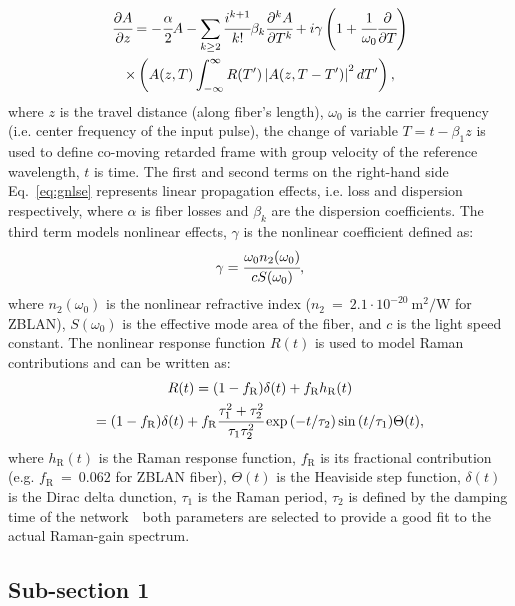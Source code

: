 \documentclass[../main.tex]{subfiles}
\begin{document}
\begin{equation}
\begin{gathered}
\cfrac{\partial A}{\partial z}=-\cfrac{\alpha}{2}A - \sum\limits_{k\geq2}\cfrac{i^{k+1}}{k!} \beta_k \cfrac{\partial^k A}{\partial T^k}+i\gamma \left(1+\cfrac{1}{\omega_0}\cfrac{\partial}{\partial T} \right)\\
\times \left(A(z,T) \int_{-\infty}^{\infty} R(T') \left|A(z,T-T')\right|^2 dT'\right),
\end{gathered}
\label{eq:gnlse}
\end{equation}
where $z$ is the travel distance (along fiber's length), $\omega_0$ is the carrier frequency (i.e. center frequency of the input pulse), the change of variable $T=t-\beta_1 z$ is used to define co-moving retarded frame with group velocity of the reference wavelength, $t$ is time.
The first and second terms on the right-hand side Eq.~\eqref{eq:gnlse} represents linear propagation effects, i.e. loss and dispersion respectively, where $\alpha$ is fiber losses and $\beta_k$ are the dispersion coefficients. The third term models nonlinear effects, $\gamma$ is the nonlinear coefficient defined as:
\begin{equation}
\gamma=\cfrac{\omega_0 n_2(\omega_0)}{c S(\omega_0)},
\label{eq:noncoef}
\end{equation}
where $n_2(\omega_0)$ is the nonlinear refractive index ($n_2~=~2.1 \cdot  10^{-20}~\mathrm{m^2/W}$ for ZBLAN), $S(\omega_0)$ is the effective mode area of the fiber, and $c$ is the light
speed constant.
The nonlinear response function $R(t)$ is used to model Raman contributions and can be written as:
\begin{equation}
\begin{gathered}
R(t)=(1-f_{\mathrm{R}})\delta(t)+f_{\mathrm{R}}h_{\mathrm{R}}(t)\\
= (1-f_{\mathrm{R}})\delta(t)+f_{\mathrm{R}}\cfrac{\tau^2_1+\tau^2_2}{\tau_1\tau^2_2}\exp{(-t/\tau_2)}\sin{(t/\tau_1)}\Theta(t),
\end{gathered}
\label{eq:ramancont}
\end{equation}
where $h_{\mathrm{R}}(t)$ is the Raman response function, $f_{\mathrm{R}}$ is its fractional contribution (e.g. $f_{\mathrm{R}}~=~0.062$ for ZBLAN fiber), $\Theta(t)$ is the Heaviside step function, $\delta(t)$ is the Dirac delta dunction, $\tau_1$ is the Raman period, $\tau_2$ is defined by the damping time of the network~\textendash~both parameters are selected to provide a good fit to the actual Raman-gain spectrum.

\subsection{Sub-section 1}

\lipsum[1-3]
\end{document}
